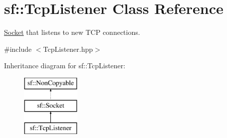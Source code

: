 \hypertarget{classsf_1_1_tcp_listener}{}\section{sf\+:\+:Tcp\+Listener Class Reference}
\label{classsf_1_1_tcp_listener}


\hyperlink{classsf_1_1_socket}{Socket} that listens to new T\+CP connections.  




{\ttfamily \#include $<$Tcp\+Listener.\+hpp$>$}

Inheritance diagram for sf\+:\+:Tcp\+Listener\+:\begin{figure}[H]
\begin{center}
\leavevmode
\includegraphics[height=3.000000cm]{classsf_1_1_tcp_listener}
\end{center}
\end{figure}
